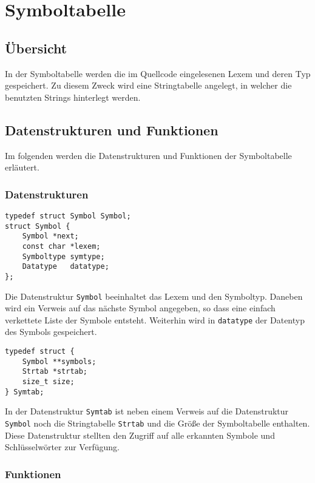 \chapter{Symboltabelle}
\label{chap:symtab}

\section{Übersicht}
\label{sec:symtab_overview}
In der Symboltabelle werden die im Quellcode eingelesenen Lexem und deren Typ gespeichert. Zu diesem Zweck wird eine Stringtabelle angelegt, in welcher die benutzten Strings hinterlegt werden.

\section{Datenstrukturen und Funktionen}
\label{sec:symtab_datastructure_function}

Im folgenden werden die Datenstrukturen und Funktionen der Symboltabelle erläutert.

\subsection{Datenstrukturen}
\label{sec:symtab_datastructure}

\begin{lstlisting}
typedef struct Symbol Symbol;
struct Symbol {
	Symbol *next;
	const char *lexem;
	Symboltype symtype;
	Datatype   datatype;
};
\end{lstlisting}
Die Datenstruktur \texttt{Symbol} beeinhaltet das Lexem und den Symboltyp. Daneben wird ein Verweis auf das nächste Symbol angegeben, so dass eine einfach verkettete Liste der Symbole entsteht.
Weiterhin wird in \texttt{datatype} der Datentyp des Symbols gespeichert.

\begin{lstlisting}
typedef struct {
	Symbol **symbols;
	Strtab *strtab;
	size_t size;
} Symtab;
\end{lstlisting}
In der Datenstruktur \texttt{Symtab} ist neben einem Verweis auf die Datenstruktur \texttt{Symbol}
noch die Stringtabelle \texttt{Strtab} und die Größe der Symboltabelle enthalten. Diese Datenstruktur stellten den Zugriff auf alle erkannten Symbole und Schlüsselwörter zur Verfügung. 

\subsection{Funktionen}
\label{sec:symtab_functions}

